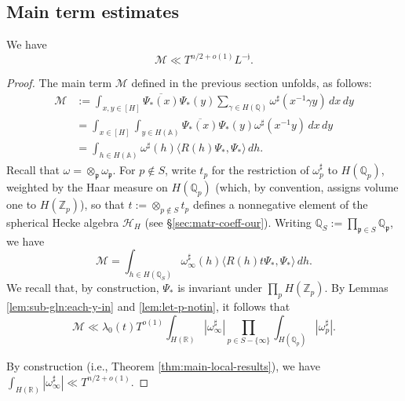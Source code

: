 \subsection{Main term estimates}\label{sec:main-term-estimates}
\begin{lemma}\label{lem:sub-gln:main-term-estimates}
  We have
  \begin{equation*}
    \mathcal{M} \ll T^{n/2 + o(1)} L^{-\mathfrak{j}}.
  \end{equation*}
\end{lemma}
\begin{proof}
  The main term $\mathcal{M}$ defined in the previous section unfolds, as follows:
  \begin{align*}
    \mathcal{M}
    &:= \int_{x, y \in [H]} \overline{\Psi_{\ast}(x)} \Psi_{\ast}(y)
      \sum_{\gamma \in H(\mathbb{Q})} \omega^\sharp(x^{-1} \gamma y) \, d x \, d y \\
    &= \int_{x \in [H]} \int_{y \in H(\mathbb{A})}\overline{\Psi_{\ast}(x)} \Psi_{\ast}(y)  \omega^\sharp(x^{-1} y) \, d x \, d y \\
    &= \int_{h \in H(\mathbb{A})}  \omega^\sharp(h) \langle R(h) \Psi_{\ast}, \Psi_{\ast} \rangle \, d h.
  \end{align*}
  Recall that $\omega = \otimes_{\mathfrak{p}} \omega_\mathfrak{p}$.  For $p \notin S$, write $t_p$ for the restriction of $\omega_p^\sharp$ to $H(\mathbb{Q}_p)$, weighted by the Haar measure on $H(\mathbb{Q}_p)$ (which, by convention, assigns volume one to $H(\mathbb{Z}_p)$), so that $t := \otimes_{p \notin S} t_p$ defines a nonnegative element of the spherical Hecke algebra $\mathcal{H}_H$ (see \S\ref{sec:matr-coeff-our}).  Writing $\mathbb{Q}_S := \prod_{\mathfrak{p} \in S} \mathbb{Q}_\mathfrak{p}$, we have
  \begin{equation*}
    \mathcal{M} = \int_{h \in H(\mathbb{Q}_S) } \omega_\infty^\sharp(h) \langle R(h) t \Psi_{\ast}, \Psi_{\ast} \rangle \, d h.
  \end{equation*}
  We recall that, by construction, $\Psi_{\ast}$ is invariant under $\prod_p H(\mathbb{Z}_p)$.  By Lemmas \ref{lem:sub-gln:each-y-in} and \ref{lem:let-p-notin}, it follows that
  \begin{equation*}
    \mathcal{M} \ll \lambda_0(t) T^{o(1)} \int_{H(\mathbb{R})} |\omega_\infty^\sharp|
    \prod_{p \in S - \{\infty\}}
    \int_{H(\mathbb{Q}_p)} |\omega_p^\sharp|.
  \end{equation*}

  By construction (i.e., Theorem \ref{thm:main-local-results}), we have $\int_{H(\mathbb{R})} |\omega_\infty^\sharp| \ll T^{n/2+o(1)}$.


\end{proof}
